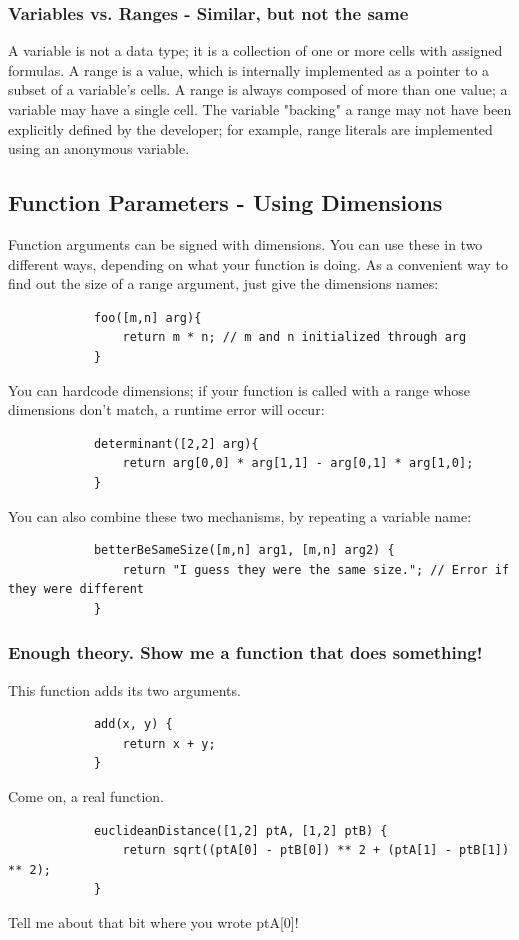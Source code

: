 		\subsubsection{Variables vs. Ranges - Similar, but not the same}
		A variable is not a data type; it is a collection of one or more cells with assigned formulas. A range is a value, which is internally implemented as a pointer to a subset of a variable's cells. A range is always composed of more than one value; a variable may have a single cell. The variable "backing" a range may not have been explicitly defined by the developer; for example, range literals are implemented using an anonymous variable.

	\subsection{Function Parameters - Using Dimensions}
		Function arguments can be signed with dimensions. You can use these in two different ways, depending on what your function is doing. As a convenient way to find out the size of a range argument, just give the dimensions names:

		\begin{lstlisting}
			foo([m,n] arg){
				return m * n; // m and n initialized through arg
			}
		\end{lstlisting}

		\medskip \noindent
		You can hardcode dimensions; if your function is called with a range whose dimensions don't match, a runtime error will occur:

		\begin{lstlisting}
			determinant([2,2] arg){
				return arg[0,0] * arg[1,1] - arg[0,1] * arg[1,0];
			}
		\end{lstlisting}
		\medskip \noindent
		You can also combine these two mechanisms, by repeating a variable name:
		\begin{lstlisting}
			betterBeSameSize([m,n] arg1, [m,n] arg2) {
				return "I guess they were the same size."; // Error if they were different
			}
		\end{lstlisting}

		\subsubsection{Enough theory. Show me a function that does something!}
		This function adds its two arguments.
		\begin{lstlisting}
			add(x, y) {
				return x + y;
			}
		\end{lstlisting}
		\medskip \noindent
		Come on, a real function.
		\begin{lstlisting}
			euclideanDistance([1,2] ptA, [1,2] ptB) {
				return sqrt((ptA[0] - ptB[0]) ** 2 + (ptA[1] - ptB[1]) ** 2);
			}
		\end{lstlisting}
		\medskip \noindent
		Tell me about that bit where you wrote ptA[0]!
